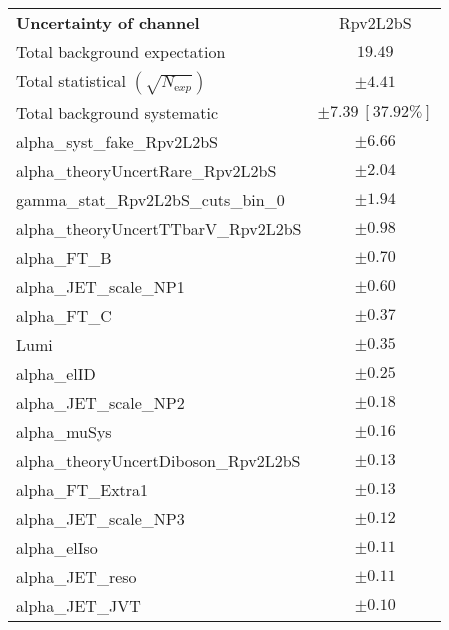
\begin{table}
\begin{center}
\setlength{\tabcolsep}{0.0pc}
\begin{tabular*}{\textwidth}{@{\extracolsep{\fill}}lc}
\noalign{\smallskip}\hline\noalign{\smallskip}
{\bfseries Uncertainty of channel}                                    & Rpv2L2bS            \\
\noalign{\smallskip}\hline\noalign{\smallskip}
Total background expectation             &  $19.49$       \\
\noalign{\smallskip}\hline\noalign{\smallskip}
Total statistical $(\sqrt{N_{\mathrm exp}})$              & $\pm 4.41$       \\
Total background systematic               & $\pm 7.39\ [37.92\%] $             \\
\noalign{\smallskip}\hline\noalign{\smallskip}
\noalign{\smallskip}\hline\noalign{\smallskip}
alpha\_syst\_fake\_Rpv2L2bS         & $\pm 6.66$       \\
alpha\_theoryUncertRare\_Rpv2L2bS         & $\pm 2.04$       \\
gamma\_stat\_Rpv2L2bS\_cuts\_bin\_0         & $\pm 1.94$       \\
alpha\_theoryUncertTTbarV\_Rpv2L2bS         & $\pm 0.98$       \\
alpha\_FT\_B         & $\pm 0.70$       \\
alpha\_JET\_scale\_NP1         & $\pm 0.60$       \\
alpha\_FT\_C         & $\pm 0.37$       \\
Lumi         & $\pm 0.35$       \\
alpha\_elID         & $\pm 0.25$       \\
alpha\_JET\_scale\_NP2         & $\pm 0.18$       \\
alpha\_muSys         & $\pm 0.16$       \\
alpha\_theoryUncertDiboson\_Rpv2L2bS         & $\pm 0.13$       \\
alpha\_FT\_Extra1         & $\pm 0.13$       \\
alpha\_JET\_scale\_NP3         & $\pm 0.12$       \\
alpha\_elIso         & $\pm 0.11$       \\
alpha\_JET\_reso         & $\pm 0.11$       \\
alpha\_JET\_JVT         & $\pm 0.10$       \\

\end{tabular*}
\end{center}
\end{table}
